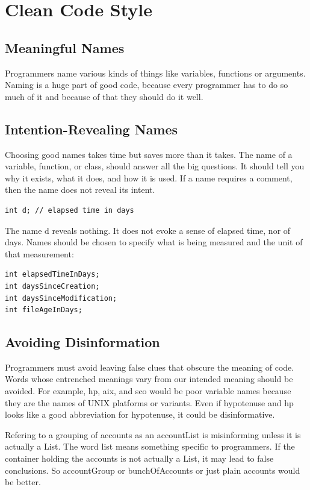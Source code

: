 \section{Clean Code Style}
\subsection{Meaningful Names}
Programmers name various kinds of things like variables, functions or arguments. Naming is a huge part of good code, because every programmer has to do so much of it and because of that they should do it well.
\subsection{Intention-Revealing Names}
Choosing good names takes time but saves more than it takes. The name of a variable, function, or class, should answer all the big questions. It should tell you why it exists, what it does, and how it is used. If a name requires a comment, then the name does not reveal its intent.
\begin{lstlisting}[label={list:first}]
int d; // elapsed time in days
\end{lstlisting}
The name d reveals nothing. It does not evoke a sense of elapsed time, nor of days. Names should be chosen to specify what is being measured and the unit of that measurement:
\begin{lstlisting}[label={list:first}]
int elapsedTimeInDays;
int daysSinceCreation;
int daysSinceModification;
int fileAgeInDays;
\end{lstlisting}

\subsection{Avoiding Disinformation}
Programmers must avoid leaving false clues that obscure the meaning of code. Words whose entrenched meanings vary from our intended meaning should be avoided. For example, hp, aix, and sco would be poor variable names because they are the names of UNIX platforms or variants. Even if hypotenuse and hp looks like a good abbreviation for hypotenuse, it could be disinformative. \citep{Martin-Code-2008}

Refering to a grouping of accounts as an accountList is misinforming unless it is actually a List. The word list means something specific to programmers. If the container holding the accounts is not actually a List, it may lead to false conclusions. So accountGroup or bunchOfAccounts or just plain accounts would be better. \citep{Martin-Code-2008}

